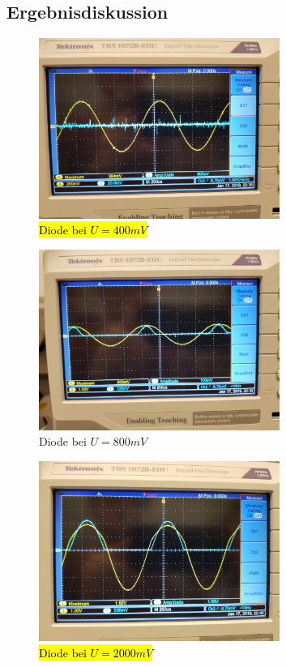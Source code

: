 \documentclass{scrartcl}
\begin{document}
\subsection{Ergebnisdiskussion}
\begin{figure}[H]
  \centering
  	\includegraphics[width=0.7\textwidth]{3_400.jpg}
  \caption{\hl{Diode bei $U=400mV$}}
  \label{fig:400mv}
\end{figure}
\begin{figure}[H]
  \centering
    \includegraphics[width=0.7\textwidth]{3_800.jpg}
  \caption{Diode bei $U=800mV$}
  \label{fig:800mv}
\end{figure}
\begin{figure}[H]
  \centering
    \includegraphics[width=0.7\textwidth]{3_2000.jpg}
  \caption{\hl{Diode bei $U=2000mV$}}
  \label{fig:2000mv}
\end{figure}
\end{document}
